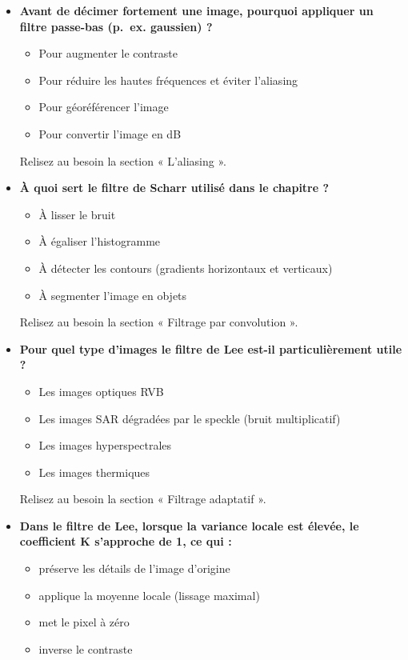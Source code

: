 \documentclass[
  french,
  11pt,
  letterpaper,
  open=any,
  twoside=false,
  french]{scrbook}
\providecommand{\tightlist}{%
  \setlength{\itemsep}{0pt}\setlength{\parskip}{0pt}}
\begin{document}
\begin{itemize}
  Relisez au besoin la section « Filtrage fréquentiel ».
\item
  \textbf{Avant de décimer fortement une image, pourquoi appliquer un
  filtre passe-bas (p.~ex. gaussien) ?}

  \begin{itemize}
  \tightlist
  \item
    Pour augmenter le contraste
  \item
    Pour réduire les hautes fréquences et éviter l'aliasing
  \item
    Pour géoréférencer l'image
  \item
    Pour convertir l'image en dB
  \end{itemize}

  Relisez au besoin la section « L'aliasing ».
\item
  \textbf{À quoi sert le filtre de Scharr utilisé dans le chapitre ?}

  \begin{itemize}
  \tightlist
  \item
    À lisser le bruit
  \item
    À égaliser l'histogramme
  \item
    À détecter les contours (gradients horizontaux et verticaux)
  \item
    À segmenter l'image en objets
  \end{itemize}

  Relisez au besoin la section « Filtrage par convolution ».
\item
  \textbf{Pour quel type d'images le filtre de Lee est-il
  particulièrement utile ?}

  \begin{itemize}
  \tightlist
  \item
    Les images optiques RVB
  \item
    Les images SAR dégradées par le speckle (bruit multiplicatif)
  \item
    Les images hyperspectrales
  \item
    Les images thermiques
  \end{itemize}

  Relisez au besoin la section « Filtrage adaptatif ».
\item
  \textbf{Dans le filtre de Lee, lorsque la variance locale est élevée,
  le coefficient K s'approche de 1, ce qui :}

  \begin{itemize}
  \tightlist
  \item
    préserve les détails de l'image d'origine
  \item
    applique la moyenne locale (lissage maximal)
  \item
    met le pixel à zéro
  \item
    inverse le contraste
  \end{itemize}


\end{itemize}
\end{document}
